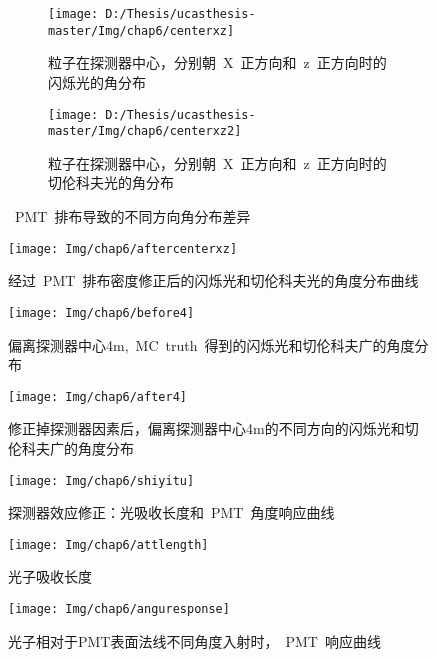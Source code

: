 \begin{figure}[!htbp]
  \centering
  \begin{subfigure}[b]{\MySubFactor\textwidth}
    \texttt{[image: D:/Thesis/ucasthesis-master/Img/chap6/centerxz]}
    \caption{粒子在探测器中心，分别朝~X~正方向和~z~正方向时的闪烁光的角分布}
    \label{fig:centerxz_1}
  \end{subfigure}%
  \quad\quad\quad\quad\quad\quad%
  \begin{subfigure}[b]{\MySubFactor\textwidth}
    \texttt{[image: D:/Thesis/ucasthesis-master/Img/chap6/centerxz2]}
    \caption{粒子在探测器中心，分别朝~X~正方向和~z~正方向时的切伦科夫光的角分布}
    \label{fig:centerxz_2}
  \end{subfigure}
  \caption{~PMT~排布导致的不同方向角分布差异}
  \label{fig:centerxz}
\end{figure}

\begin{figure}[!htbp]
  \centering
   \texttt{[image: Img/chap6/aftercenterxz]}
    \caption{经过~PMT~排布密度修正后的闪烁光和切伦科夫光的角度分布曲线}
  \label{fig:aftercenterxz}
\end{figure}

\begin{figure}[!htbp]
  \centering
   \texttt{[image: Img/chap6/before4]}
    \caption{偏离探测器中心4m,~MC~truth~得到的闪烁光和切伦科夫广的角度分布}
  \label{fig:before4}
\end{figure}

\begin{figure}[!htbp]
  \centering
   \texttt{[image: Img/chap6/after4]}
    \caption{修正掉探测器因素后，偏离探测器中心4m的不同方向的闪烁光和切伦科夫广的角度分布}
  \label{fig:after4}
\end{figure}

\begin{figure}[!htbp]
  \centering
   \texttt{[image: Img/chap6/shiyitu]}
    \caption{探测器效应修正：光吸收长度和~PMT~角度响应曲线}
  \label{fig:shiyitu}
\end{figure}

\begin{figure}[!htbp]
  \centering
   \texttt{[image: Img/chap6/attlength]}
    \caption{光子吸收长度}
  \label{fig:attlength}
\end{figure}
\begin{figure}[!htbp]
  \centering
   \texttt{[image: Img/chap6/anguresponse]}
    \caption{光子相对于PMT表面法线不同角度入射时，~PMT~响应曲线}
  \label{fig:anguresponse}
\end{figure}

